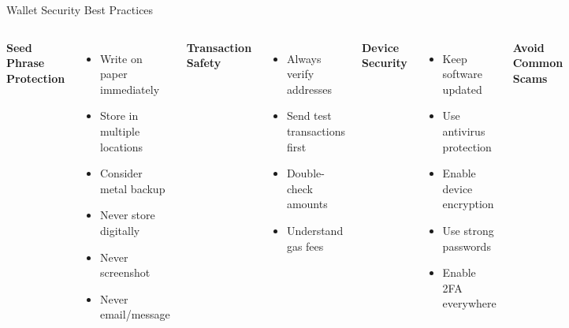 \documentclass[8pt,aspectratio=169]{beamer}
\begin{document}
\begin{frame}[t]{Wallet Security Best Practices}
\begin{columns}[T]
\textbf{Seed Phrase Protection}

\begin{itemize}
\item[\textcolor{mlgreen}{\checkmark}] Write on paper immediately
\item[\textcolor{mlgreen}{\checkmark}] Store in multiple locations
\item[\textcolor{mlgreen}{\checkmark}] Consider metal backup
\item[\textcolor{mlred}{$\times$}] Never store digitally
\item[\textcolor{mlred}{$\times$}] Never screenshot
\item[\textcolor{mlred}{$\times$}] Never email/message
\end{itemize}

\vspace{0.5em}
\textbf{Transaction Safety}

\begin{itemize}
\item[\textcolor{mlgreen}{\checkmark}] Always verify addresses
\item[\textcolor{mlgreen}{\checkmark}] Send test transactions first
\item[\textcolor{mlgreen}{\checkmark}] Double-check amounts
\item[\textcolor{mlgreen}{\checkmark}] Understand gas fees
\end{itemize}

\textbf{Device Security}

\begin{itemize}
\item[\textcolor{mlgreen}{\checkmark}] Keep software updated
\item[\textcolor{mlgreen}{\checkmark}] Use antivirus protection
\item[\textcolor{mlgreen}{\checkmark}] Enable device encryption
\item[\textcolor{mlgreen}{\checkmark}] Use strong passwords
\item[\textcolor{mlgreen}{\checkmark}] Enable 2FA everywhere
\end{itemize}

\vspace{0.5em}
\textbf{Avoid Common Scams}


\end{columns}
\end{frame}
\end{document}
